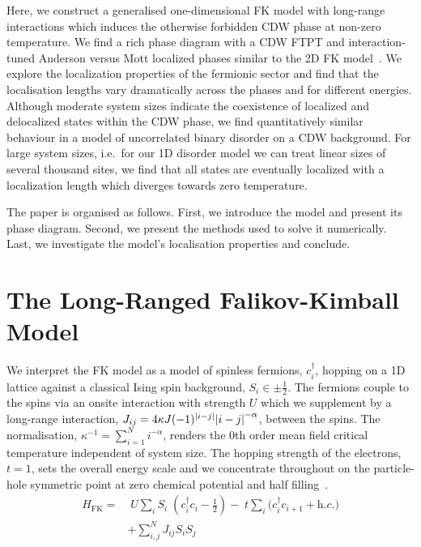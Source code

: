Here, we construct a generalised one-dimensional {FK} model with long-range interactions which induces the otherwise forbidden {CDW} phase at non-zero temperature. We find a rich phase diagram with a CDW FTPT and interaction-tuned Anderson versus Mott localized phases similar to the 2D {FK} model~\autocite{antipovInteractionTunedAndersonMott2016}. We explore the localization properties of the fermionic sector and find that the localisation lengths vary dramatically across the phases and for different energies. Although moderate system sizes indicate the coexistence of localized and delocalized states within the CDW phase, we find quantitatively similar behaviour in a model of uncorrelated binary disorder on a {CDW} background. For large system sizes, i.e.~for our 1D disorder model we can treat linear sizes of several thousand sites, we find that all states are eventually localized with a localization length which diverges towards zero temperature.

The paper is organised as follows. First, we introduce the model and present its phase diagram. Second, we present the methods used to solve it numerically. Last, we investigate the model's localisation properties and conclude.

\hypertarget{the-long-ranged-falikov-kimball-model}{%
\section{The Long-Ranged Falikov-Kimball Model}\label{the-long-ranged-falikov-kimball-model}}

We interpret the {FK} model as a model of spinless fermions, \(c^\dag_{i}\), hopping on a 1D lattice against a classical Ising spin background, \(S_i \in {\pm \frac{1}{2}}\). The fermions couple to the spins via an onsite interaction with strength \(U\) which we supplement by a long-range interaction, \(J_{ij} = 4\kappa J (-1)^{\abs{i-j}} \abs{i-j}^{-\alpha}\), between the spins. The normalisation, \(\kappa^{-1} = \sum_{i=1}^{N} i^{-\alpha}\), renders the 0th order mean field critical temperature independent of system size. The hopping strength of the electrons, \(t = 1\), sets the overall energy scale and we concentrate throughout on the particle-hole symmetric point at zero chemical potential and half filling~\autocite{gruberFalicovKimballModelReview1996}. ~ \[\begin{aligned}
H_{\mathrm{FK}} = & \;U \sum_{i} S_i\;(c^\dag_{i}c_{i} - \tfrac{1}{2}) -\;t \sum_{i} (c^\dag_{i}c_{i+1} + \textit{h.c.)}\\ 
 &  + \sum_{i, j}^{N} J_{ij}  S_i S_j \nonumber
\label{eq:HFK}\end{aligned}\]

